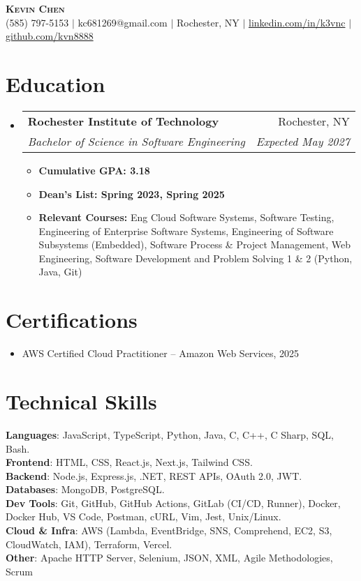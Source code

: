 \documentclass[letterpaper,11pt]{article}
\makeatletter
\newcommand{\resumeItem}[1]{
  \item\small{
    {#1 \vspace{-2pt}}
  }
}
\newcommand{\resumeSubheading}[4]{
  \vspace{-2pt}\item
    \begin{tabular*}{0.97\textwidth}[t]{l@{\extracolsep{\fill}}r}
      \textbf{#1} & #2 \\
      \textit{\small#3} & \textit{\small #4} \\
    \end{tabular*}\vspace{-7pt}
}
\newcommand{\resumeSubHeadingListStart}{\begin{itemize}[leftmargin=0.15in, label={}]}
\newcommand{\resumeSubHeadingListEnd}{\end{itemize}}
\newcommand{\resumeItemListStart}{\begin{itemize}}
\newcommand{\resumeItemListEnd}{\end{itemize}\vspace{-5pt}}
\makeatother
\begin{document}
\begin{center}
    \textbf{\Huge \scshape Kevin Chen} \\ \vspace{1pt}
    \small (585) 797-5153 $|$ kc681269@gmail.com $|$ Rochester, NY $|$ 
    \href{https://www.linkedin.com/in/k3vnc/}{linkedin.com/in/k3vnc} $|$ 
    \href{https://github.com/kvn8888}{github.com/kvn8888}
\end{center}

\section{Education}
  \resumeSubHeadingListStart
    \resumeSubheading
      {Rochester Institute of Technology}{Rochester, NY}
      {Bachelor of Science in Software Engineering}{Expected May 2027}
      \resumeItemListStart
        \resumeItem{\textbf{Cumulative GPA: 3.18}}
        \resumeItem{\textbf{Dean's List: Spring 2023, Spring 2025}}
        \resumeItem{\textbf{Relevant Courses:} Eng Cloud Software Systems, Software Testing, Engineering of Enterprise Software Systems, Engineering of Software Subsystems (Embedded), Software Process \& Project Management, Web Engineering, Software Development and Problem Solving 1 \& 2 (Python, Java, Git)}
      \resumeItemListEnd
  \resumeSubHeadingListEnd

\section{Certifications}
  \resumeSubHeadingListStart
    \resumeItem{AWS Certified Cloud Practitioner -- Amazon Web Services, 2025}
  \resumeSubHeadingListEnd

\section{Technical Skills}
\begin{itemize}[leftmargin=0.15in, label={}]
\small{\item{
\textbf{Languages}{: JavaScript, TypeScript, Python, Java, C, C++, C Sharp, SQL, Bash.} \\
\textbf{Frontend}{: HTML, CSS, React.js, Next.js, Tailwind CSS.} \\
\textbf{Backend}{: Node.js, Express.js, .NET, REST APIs, OAuth 2.0, JWT.} \\
\textbf{Databases}{: MongoDB, PostgreSQL.} \\
\textbf{Dev Tools}{: Git, GitHub, GitHub Actions, GitLab (CI/CD, Runner), Docker, Docker Hub, VS Code, Postman, cURL, Vim, Jest, Unix/Linux.} \\
\textbf{Cloud \& Infra}{: AWS (Lambda, EventBridge, SNS, Comprehend, EC2, S3, CloudWatch, IAM), Terraform, Vercel.} \\
\textbf{Other}{: Apache HTTP Server, Selenium, JSON, XML, Agile Methodologies, Scrum}}}
\end{itemize}
\end{document}
